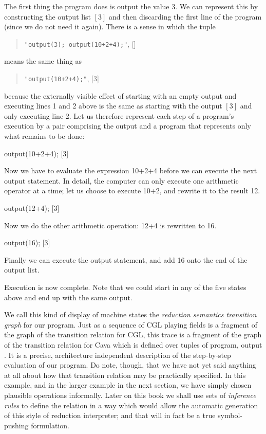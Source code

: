 \documentclass[11pt]{book}
\begin{document}
The first thing the program does is output the value 3. We can represent this by constructing the output list $[3]$ and then discarding the first line of the program (since we do not need it again). There is a sense in which the tuple \begin{quote}$ $\verb^"output(3); output(10+2+4);"^, []$  $\end{quote} means the same thing as
\begin{quote}$ $\verb^"output(10+2+4);"^, [3]$  $\end{quote}
because the externally visible effect of starting with an empty output and executing lines 1 and 2 above is the same as starting with the output $[3]$ and only executing line 2. Let us therefore represent each step of a program's execution by a pair comprising the output and a program that represents only what remains to be done:
\begin{codeblock}
output(10+2+4); [3]
\end{codeblock}
Now we have to evaluate the expression 10+2+4 before we can execute the next output statement. In detail, the computer can only execute one arithmetic operator at a time; let us choose to execute 10+2, and rewrite it to the result 12.
\begin{codeblock}
output(12+4); [3]
\end{codeblock}
Now we do the other arithmetic operation: 12+4 is rewritten to 16.
\begin{codeblock}
output(16); [3]
\end{codeblock}
Finally we can execute the output statement, and add 16 onto the end of the output list.
\begin{codeblock}
[3, 16]
\end{codeblock}

Execution is now complete. Note that we could start in any of the five states above and end up with the same output.

We call this kind of display of machine states the {\em reduction semantics transition graph} for our program. Just as a sequence of CGL playing fields is a fragment of the graph of the transition relation for CGL, this trace is a fragment of the graph of the transition relation for Cava which is defined over tuples of $ $program, output$  $. It is a precise, architecture independent description of the step-by-step evaluation of our program. Do note, though, that we have not yet said anything at all about how that transition relation may be practically specified. In this example, and in the larger example in the next section, we have simply chosen plausible operations informally. Later on this book we shall use sets of {\em inference rules} to define the relation in a way which would allow the automatic generation of this style of reduction interpreter; and that will in fact be a true symbol-pushing formulation.
 
\end{document}
